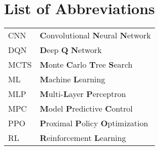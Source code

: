 \chapter*{List of Abbreviations}

\begin{table}[h!]
  \centering
  \begin{tabular}{ll}
    CNN & \textbf{C}onvolutional \textbf{N}eural \textbf{N}etwork \\
    DQN & \textbf{D}eep \textbf{Q} \textbf{N}etwork \\     MCTS &
    \textbf{M}onte \textbf{C}arlo \textbf{T}ree \textbf{S}earch \\
    ML & \textbf{M}achine \textbf{L}earning \\     MLP &
    \textbf{M}ulti-\textbf{L}ayer \textbf{P}erceptron \\     MPC &
    \textbf{M}odel \textbf{P}redictive \textbf{C}ontrol \\     PPO &
    \textbf{P}roximal \textbf{P}olicy \textbf{O}ptimization \\     RL
    & \textbf{R}einforcement \textbf{L}earning \\
  \end{tabular}
\end{table}
